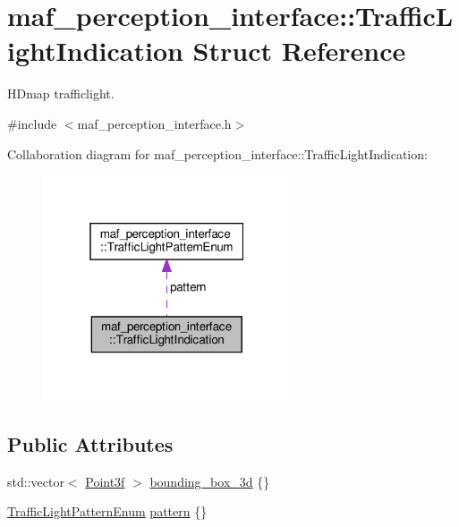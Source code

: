 \hypertarget{structmaf__perception__interface_1_1TrafficLightIndication}{}\section{maf\+\_\+perception\+\_\+interface\+:\+:Traffic\+Light\+Indication Struct Reference}
\label{structmaf__perception__interface_1_1TrafficLightIndication}


H\+Dmap trafficlight.  




{\ttfamily \#include $<$maf\+\_\+perception\+\_\+interface.\+h$>$}



Collaboration diagram for maf\+\_\+perception\+\_\+interface\+:\+:Traffic\+Light\+Indication\+:\nopagebreak
\begin{figure}[H]
\begin{center}
\leavevmode
\includegraphics[width=208pt]{structmaf__perception__interface_1_1TrafficLightIndication__coll__graph}
\end{center}
\end{figure}
\subsection*{Public Attributes}
\begin{DoxyCompactItemize}
\item 
std\+::vector$<$ \hyperlink{structmaf__perception__interface_1_1Point3f}{Point3f} $>$ \hyperlink{structmaf__perception__interface_1_1TrafficLightIndication_ae49addc66f18a3049c90d6547bb4cef4}{bounding\+\_\+box\+\_\+3d} \{\}
\item 
\hyperlink{structmaf__perception__interface_1_1TrafficLightPatternEnum}{Traffic\+Light\+Pattern\+Enum} \hyperlink{structmaf__perception__interface_1_1TrafficLightIndication_a7625dc3b857582688315b78f77431048}{pattern} \{\}
\end{DoxyCompactItemize}


